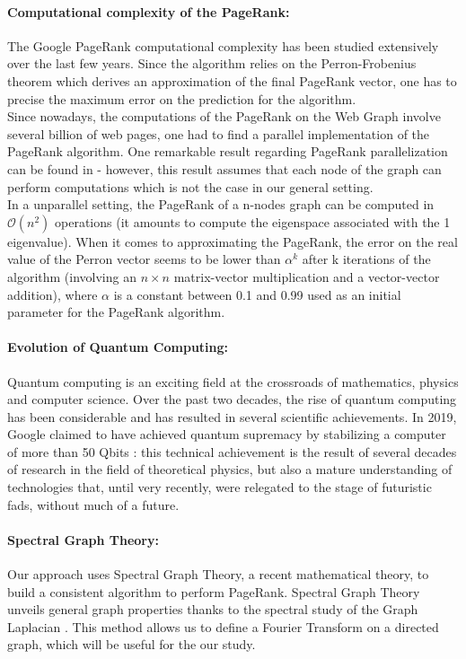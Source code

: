 \documentclass{article}
\begin{document}
\paragraph{Computational complexity of the PageRank:} The Google PageRank computational complexity has been studied extensively over the last few years. Since the algorithm relies on the Perron-Frobenius theorem which derives an approximation of the final PageRank vector, one has to precise the maximum error on the prediction for the algorithm.\\
Since nowadays, the computations of the PageRank on the Web Graph involve several billion of web pages, one had to find a parallel implementation of the PageRank algorithm. One remarkable result regarding PageRank parallelization can be found in \cite{sarma_molla_pandurangan_upfal_2013} - however, this result assumes that each node of the graph can perform computations which is not the case in our general setting.\\
In a unparallel setting, the PageRank of a n-nodes graph can be computed in $\mathcal{O}(n^2)$ operations (it amounts to compute the eigenspace associated with the 1 eigenvalue). When it comes to approximating the PageRank, the error on the real value of the Perron vector seems to be lower than $\alpha^k$ after k iterations of the algorithm (involving an $n\times n$ matrix-vector multiplication and a vector-vector addition), where $\alpha$ is a constant between 0.1 and 0.99 used as an initial parameter for the PageRank algorithm.\\


\paragraph{Evolution of Quantum Computing:}
Quantum computing is an exciting field at the crossroads of mathematics, physics and computer science. Over the past two decades, the rise of quantum computing has been considerable and has resulted in several scientific achievements. In 2019, Google claimed to have achieved quantum supremacy by stabilizing a computer of more than 50 Qbits \cite{google2019}: this technical achievement is the result of several decades of research in the field of theoretical physics, but also a mature understanding of technologies that, until very recently, were relegated to the stage of futuristic fads, without much of a future.\\

\paragraph{Spectral Graph Theory:}
Our approach uses Spectral Graph Theory, a recent mathematical theory, to build a consistent algorithm to perform PageRank. Spectral Graph Theory unveils general graph properties thanks to the spectral study of the Graph Laplacian \cite{ricaud2019}. This method allows us to define a Fourier Transform on a directed graph, which will be useful for the our study.\\
\end{document}
